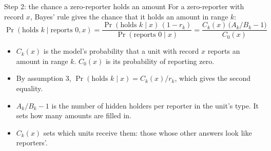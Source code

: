 \begin{frame}{Step 2: the chance a zero-reporter holds an amount}
  \small
  For a zero-reporter with record $x$, Bayes' rule gives the chance that it holds an amount in
  range $k$:
  \[
    \Pr(\text{holds } k \mid \text{reports } 0, x)
    = \frac{\Pr(\text{holds } k \mid x)\,(1 - r_k)}{\Pr(\text{reports } 0 \mid x)}
    = \frac{C_k(x)\,\big(A_k / B_k - 1\big)}{C_0(x)}
  \]
  \begin{itemize}
    \item $C_k(x)$ is the model's probability that a unit with record $x$ reports an amount in range
          $k$. $C_0(x)$ is its probability of reporting zero.
    \item By assumption 3, $\Pr(\text{holds } k \mid x) = C_k(x) / r_k$, which gives the second
          equality.
    \item $A_k / B_k - 1$ is the number of hidden holders per reporter in the unit's type. It sets
          how many amounts are filled in.
    \item $C_k(x)$ sets which units receive them: those whose other answers look like reporters'.
  \end{itemize}
\end{frame}


